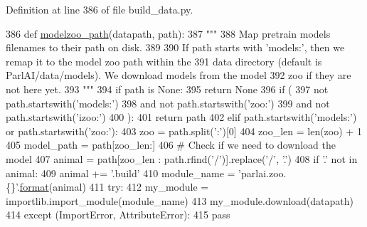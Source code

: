 Definition at line 386 of file build\+\_\+data.\+py.


\begin{DoxyCode}
386 \textcolor{keyword}{def }\hyperlink{namespaceparlai_1_1core_1_1build__data_ad06e9e38ca85db9c4a676ccd9ae41649}{modelzoo\_path}(datapath, path):
387     \textcolor{stringliteral}{"""}
388 \textcolor{stringliteral}{    Map pretrain models filenames to their path on disk.}
389 \textcolor{stringliteral}{}
390 \textcolor{stringliteral}{    If path starts with 'models:', then we remap it to the model zoo path within the}
391 \textcolor{stringliteral}{    data directory (default is ParlAI/data/models). We download models from the model}
392 \textcolor{stringliteral}{    zoo if they are not here yet.}
393 \textcolor{stringliteral}{    """}
394     \textcolor{keywordflow}{if} path \textcolor{keywordflow}{is} \textcolor{keywordtype}{None}:
395         \textcolor{keywordflow}{return} \textcolor{keywordtype}{None}
396     \textcolor{keywordflow}{if} (
397         \textcolor{keywordflow}{not} path.startswith(\textcolor{stringliteral}{'models:'})
398         \textcolor{keywordflow}{and} \textcolor{keywordflow}{not} path.startswith(\textcolor{stringliteral}{'zoo:'})
399         \textcolor{keywordflow}{and} \textcolor{keywordflow}{not} path.startswith(\textcolor{stringliteral}{'izoo:'})
400     ):
401         \textcolor{keywordflow}{return} path
402     \textcolor{keywordflow}{elif} path.startswith(\textcolor{stringliteral}{'models:'}) \textcolor{keywordflow}{or} path.startswith(\textcolor{stringliteral}{'zoo:'}):
403         zoo = path.split(\textcolor{stringliteral}{':'})[0]
404         zoo\_len = len(zoo) + 1
405         model\_path = path[zoo\_len:]
406         \textcolor{comment}{# Check if we need to download the model}
407         animal = path[zoo\_len : path.rfind(\textcolor{stringliteral}{'/'})].replace(\textcolor{stringliteral}{'/'}, \textcolor{stringliteral}{'.'})
408         \textcolor{keywordflow}{if} \textcolor{stringliteral}{'.'} \textcolor{keywordflow}{not} \textcolor{keywordflow}{in} animal:
409             animal += \textcolor{stringliteral}{'.build'}
410         module\_name = \textcolor{stringliteral}{'parlai.zoo.\{\}'}.\hyperlink{namespaceparlai_1_1chat__service_1_1services_1_1messenger_1_1shared__utils_a32e2e2022b824fbaf80c747160b52a76}{format}(animal)
411         \textcolor{keywordflow}{try}:
412             my\_module = importlib.import\_module(module\_name)
413             my\_module.download(datapath)
414         \textcolor{keywordflow}{except} (ImportError, AttributeError):
415             \textcolor{keywordflow}{pass}

\end{DoxyCode}
